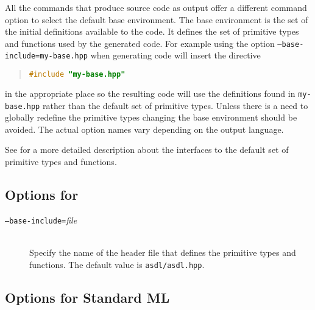 All the commands that produce source code as output offer a different
command option to select the default base environment.
The base environment is the set of the initial definitions available to the code.
It defines the set of primitive types and functions used by the generated code.
For example using the option \texttt{--base-include=my-base.hpp}
when generating \Cplusplus{} code will insert the directive
\begin{quote}\begin{lstlisting}[language=c++]
#include "my-base.hpp"
\end{lstlisting}\end{quote}%
in the appropriate place so the resulting code will use the definitions found in
\texttt{my-base.hpp} rather than the default set of primitive types.
Unless there is a need to globally redefine
the primitive types changing the base environment should be avoided.
The actual option names vary depending on the output language.

See  for a more detailed description about the interfaces
to the default set of primitive types and functions.

\subsection*{Options for \Cplusplus}

\begin{description}
  \item[\normalfont\texttt{--base-include=}\textit{file}] \mbox{}\\
    Specify the name of the \Cplusplus{} header file that defines the primitive \asdl{} types
    and functions.
    The default value is \texttt{asdl/asdl.hpp}.
\end{description}%

\subsection*{Options for Standard ML}

